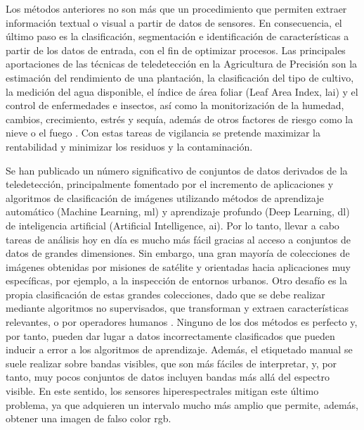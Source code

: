 Los métodos anteriores no son más que un procedimiento que permiten extraer información textual o visual a partir de datos de sensores. En consecuencia, el último paso es la clasificación, segmentación e identificación de características a partir de los datos de entrada, con el fin de optimizar procesos. Las principales aportaciones de las técnicas de teledetección en la Agricultura de Precisión son la estimación del rendimiento de una plantación, la clasificación del tipo de cultivo, la medición del agua disponible, el índice de área foliar (Leaf Area Index, \acrshort{lai}) y el control de enfermedades e insectos, así como la monitorización de la humedad, cambios, crecimiento, estrés y sequía, además de otros factores de riesgo como la nieve o el fuego \cite{huang_agricultural_2018}. Con estas tareas de vigilancia se pretende maximizar la rentabilidad y minimizar los residuos y la contaminación. 

Se han publicado un número significativo de conjuntos de datos derivados de la teledetección, principalmente fomentado por el incremento de aplicaciones y algoritmos de clasificación de imágenes utilizando métodos de aprendizaje automático (Machine Learning, \acrshort{ml}) y aprendizaje profundo (Deep Learning, \acrshort{dl}) de inteligencia artificial (Artificial Intelligence, \acrshort{ai}). Por lo tanto, llevar a cabo tareas de análisis hoy en día es mucho más fácil gracias al acceso a conjuntos de datos de grandes dimensiones. Sin embargo, una gran mayoría de colecciones de imágenes obtenidas por misiones de satélite y orientadas hacia aplicaciones muy específicas, por ejemplo, a la inspección de entornos urbanos. Otro desafío es la propia clasificación de estas grandes colecciones, dado que se debe realizar mediante algoritmos no supervisados, que transforman y extraen características relevantes, o por operadores humanos \cite{li_image_2021, basu_deepsat_2015}. Ninguno de los dos métodos es perfecto y, por tanto, pueden dar lugar a datos incorrectamente clasificados que pueden inducir a error a los algoritmos de aprendizaje. Además, el etiquetado manual se suele realizar sobre bandas visibles, que son más fáciles de interpretar, y, por tanto, muy pocos conjuntos de datos incluyen bandas más allá del espectro visible. En este sentido, los sensores hiperespectrales mitigan este último problema, ya que adquieren un intervalo mucho más amplio que permite, además, obtener una imagen de falso color \acrshort{rgb}.

